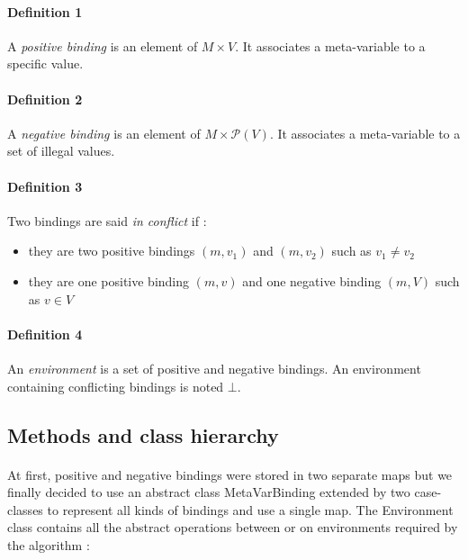 \documentclass{report}
\begin{document}
\paragraph{Definition 1}
A \textit{positive binding} is an element of $M \times V$. It associates a meta-variable to a specific value.

\paragraph{Definition 2}
A \textit{negative binding} is an element of $M \times \mathscr{P}(V)$. It associates a meta-variable to a set of illegal values.

\paragraph{Definition 3}
Two bindings are said \textit{in conflict} if :

\vspace{1.5mm}
\begin{itemize}
\item they are two positive bindings $(m,v_1)$ and $(m,v_2)$ such as $v_1 \neq v_2$\vspace{1mm}
\item they are one positive binding $(m,v)$ and one negative binding $(m,V)$ such as
$v \in V$\vspace{1mm}
\end{itemize}

\paragraph{Definition 4}
An \textit{environment} is a set of positive and negative bindings.  An environment 
containing conflicting bindings is noted $\bot$.

\subsection* {Methods and class hierarchy}
\paragraph{}
\hspace{4mm}At first, positive and negative bindings were stored in two separate maps but we finally decided 
to use an abstract class MetaVarBinding extended by two case-classes to represent all kinds of bindings and use a single map.
The Environment class contains all the abstract operations between or on environments required by the algorithm :
\end{document}
